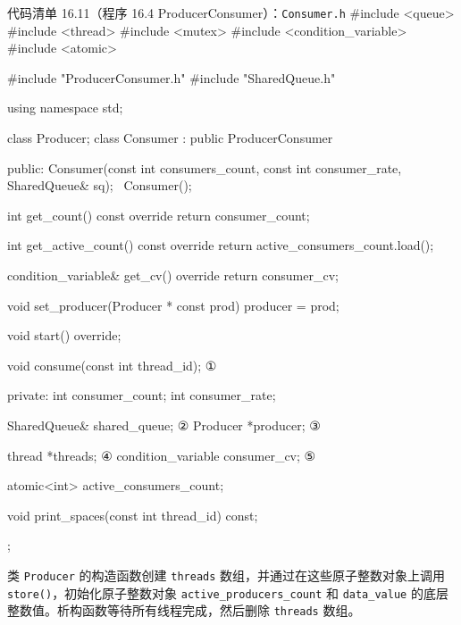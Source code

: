 \begin{codeboxt}{代码清单 16.11（程序 16.4 ProducerConsumer）：\texttt{Consumer.\allowbreak{}h}}
#include <queue>
#include <thread>
#include <mutex>
#include <condition_variable>
#include <atomic>

#include "ProducerConsumer.h"
#include "SharedQueue.h"

using namespace std;

class Producer;
class Consumer : public ProducerConsumer
{
public:
    Consumer(const int consumers_count, const int consumer_rate,
             SharedQueue& sq);
    ~Consumer();

    int get_count() const override { return consumer_count; }

    int get_active_count() const override
    {
        return active_consumers_count.load();
    }

    condition_variable& get_cv() override { return consumer_cv; }

    void set_producer(Producer * const prod)
    {
        producer = prod;
    }

    void start() override;

    void consume(const int thread_id);     ①

private:
    int consumer_count;
    int consumer_rate;

    SharedQueue& shared_queue;             ②
    Producer *producer;                    ③

    thread *threads;                       ④
    condition_variable consumer_cv;        ⑤

    atomic<int> active_consumers_count;

    void print_spaces(const int thread_id) const;
};
\end{codeboxt}
\par
{}\par
{}\par
{}\par
{}\par

类 \texttt{Producer} 的构造函数创建 \texttt{threads} 数组，并通过在这些原子整数对象上调用 \texttt{store()}，初始化原子整数对象 \texttt{active\_\allowbreak{}producers\_\allowbreak{}count} 和 \texttt{data\_\allowbreak{}value} 的底层整数值。析构函数等待所有线程完成，然后删除 \texttt{threads} 数组。

